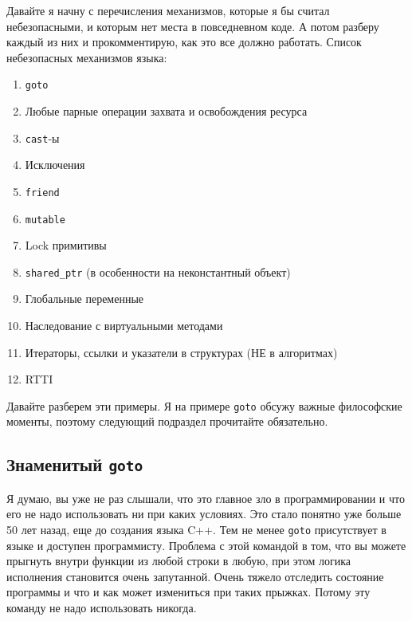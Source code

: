 Давайте я начну с перечисления механизмов, которые я бы считал небезопасными, и которым нет места в повседневном коде.
А потом разберу каждый из них и прокомментирую, как это все должно работать.
Список небезопасных механизмов языка:
\begin{enumerate}
\item \verb"goto"

\item Любые парные операции захвата и освобождения ресурса

\item \verb"cast"-ы

\item Исключения

\item \verb"friend"

\item \verb"mutable"

\item Lock примитивы

\item \verb"shared_ptr" (в особенности на неконстантный объект)

\item Глобальные переменные

\item Наследование с виртуальными методами

\item Итераторы, ссылки и указатели в структурах (НЕ в алгоритмах)

\item RTTI
\end{enumerate}


Давайте разберем эти примеры.
Я на примере \verb"goto" обсужу важные философские моменты, поэтому следующий подраздел прочитайте обязательно.

\subsection{Знаменитый \texttt{goto}}

Я думаю, вы уже не раз слышали, что это главное зло в программировании и что его не надо использовать ни при каких условиях.
Это стало понятно уже больше 50 лет назад, еще до создания языка C++.
Тем не менее \verb"goto" присутствует в языке и доступен программисту.
Проблема с этой командой в том, что вы можете прыгнуть внутри функции из любой строки в любую, при этом логика исполнения становится очень запутанной.
Очень тяжело отследить состояние программы и что и как может измениться при таких прыжках.
Потому эту команду не надо использовать никогда.

